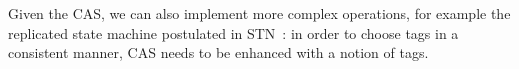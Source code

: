 \documentclass[conference]{sigcomm-alternate}
\begin{document}
Given the CAS, we can also implement more complex operations,
for example the replicated state machine postulated in STN~\cite{stn}:
in order to choose tags in a consistent manner, CAS needs to be enhanced
with a notion of tags. 

%
%
%

\end{document}
